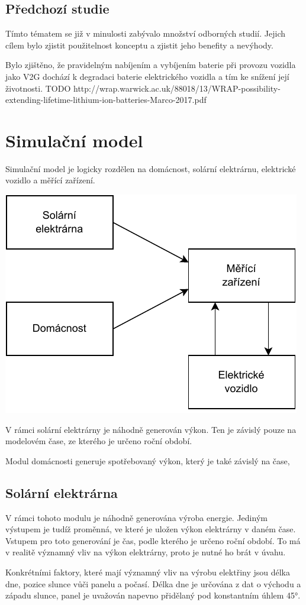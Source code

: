 \documentclass[12pt,a4paper]{article}
\begin{document}
\subsection{Předchozí studie}
Tímto tématem se již v minulosti zabývalo množství odborných studií. Jejich cílem bylo zjistit použitelnost konceptu a zjistit jeho benefity a nevýhody. 


Bylo zjištěno, že pravidelným nabíjením a vybíjením baterie při provozu vozidla jako V2G dochází k degradaci baterie elektrického vozidla a tím ke snížení její životnosti.
TODO http://wrap.warwick.ac.uk/88018/13/WRAP-possibility-extending-lifetime-lithium-ion-batteries-Marco-2017.pdf

\section{Simulační model}
Simulační model je logicky rozdělen na domácnost, solární elektrárnu, elektrické vozidlo a měřící zařízení.

\bigskip
\includegraphics[width=0.5\linewidth]{img/diagram.pdf}
\bigskip

V rámci solární elektrárny je náhodně generován výkon.
Ten je závislý pouze na modelovém čase, ze kterého je určeno roční období.

Modul domácnosti generuje spotřebovaný výkon, který je také závislý na čase,


\subsection{Solární elektrárna}
V rámci tohoto modulu je náhodně generována výroba energie.
Jediným výstupem je tudíž proměnná, ve které je uložen výkon elektrárny v daném čase.
Vstupem pro toto generování je čas, podle kterého je určeno roční období.
To má v realitě významný vliv na výkon elektrárny, proto je nutné ho brát v úvahu.

Konkrétními faktory, které mají významný vliv na výrobu elektřiny jsou délka dne, pozice slunce vůči panelu a počasí.
Délka dne je určována z dat o východu a západu slunce, panel je uvažován napevno přidělaný pod konstantním úhlem 45°.
\end{document}
